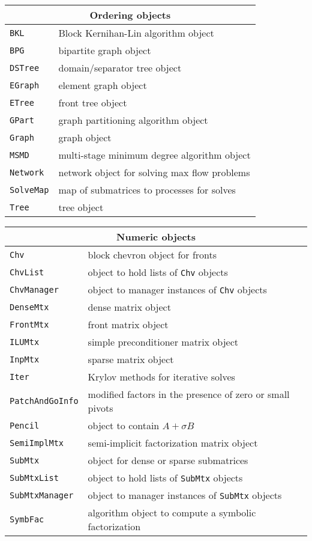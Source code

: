 \par
\begin{center}
\begin{tabular}{|l|l|} 
\multicolumn{2}{c}{\bf Ordering objects} \\ \hline
{\tt BKL} & Block Kernihan-Lin algorithm object \\
{\tt BPG} & bipartite graph object \\
{\tt DSTree} & domain/separator tree object \\
{\tt EGraph} & element graph object \\
{\tt ETree} & front tree object \\
{\tt GPart} & graph partitioning algorithm object \\
{\tt Graph} & graph object \\
{\tt MSMD} & multi-stage minimum degree algorithm object \\
{\tt Network} & network object for solving max flow problems \\
{\tt SolveMap} & map of submatrices to processes for solves \\
{\tt Tree} & tree object \\
\hline
\end{tabular}
\end{center}
\par
\begin{center}
\begin{tabular}{|l|l|} 
\multicolumn{2}{c}{\bf Numeric objects} \\ \hline
{\tt Chv} & block chevron object for fronts \\
{\tt ChvList} & object to hold lists of {\tt Chv} objects \\
{\tt ChvManager} & object to manager instances of {\tt Chv} objects \\
{\tt DenseMtx} & dense matrix object \\
{\tt FrontMtx} & front matrix object \\
{\tt ILUMtx} & simple preconditioner matrix object \\
{\tt InpMtx} & sparse matrix object \\
{\tt Iter} & Krylov methods for iterative solves \\
{\tt PatchAndGoInfo} & 
    modified factors in the presence of zero or small pivots \\
{\tt Pencil} & object to contain $A + \sigma B$ \\
{\tt SemiImplMtx} & semi-implicit factorization matrix object \\
{\tt SubMtx} & object for dense or sparse submatrices \\
{\tt SubMtxList} & object to hold lists of {\tt SubMtx} objects \\
{\tt SubMtxManager} & 
       object to manager instances of {\tt SubMtx} objects \\
{\tt SymbFac} & algorithm object to compute a symbolic factorization \\
\hline
\end{tabular}
\end{center}

